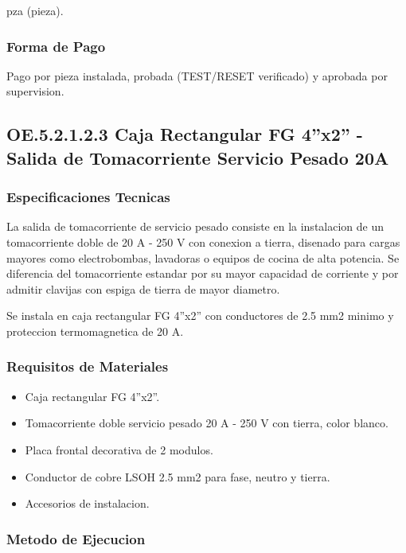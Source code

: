 pza (pieza).

\subsubsection{Forma de Pago}

Pago por pieza instalada, probada (TEST/RESET verificado) y aprobada por supervision.

\subsection{OE.5.2.1.2.3 Caja Rectangular FG 4''x2'' - Salida de Tomacorriente Servicio Pesado 20A}

\subsubsection{Especificaciones Tecnicas}

La salida de tomacorriente de servicio pesado consiste en la instalacion de un tomacorriente doble de 20 A - 250 V con conexion a tierra, disenado para cargas mayores como electrobombas, lavadoras o equipos de cocina de alta potencia. Se diferencia del tomacorriente estandar por su mayor capacidad de corriente y por admitir clavijas con espiga de tierra de mayor diametro.

Se instala en caja rectangular FG 4''x2'' con conductores de 2.5 mm2 minimo y proteccion termomagnetica de 20 A.

\subsubsection{Requisitos de Materiales}

\begin{itemize}
  \item Caja rectangular FG 4''x2''.
  \item Tomacorriente doble servicio pesado 20 A - 250 V con tierra, color blanco.
  \item Placa frontal decorativa de 2 modulos.
  \item Conductor de cobre LSOH 2.5 mm2 para fase, neutro y tierra.
  \item Accesorios de instalacion.
\end{itemize}

\subsubsection{Metodo de Ejecucion}

